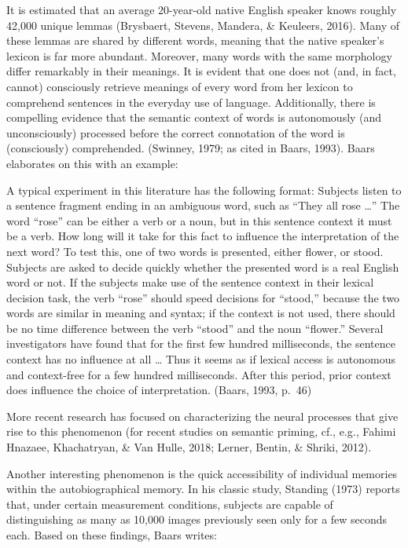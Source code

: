 \documentclass[12pt,twoside]{reedthesis}
\begin{document}
It is estimated that an average 20-year-old native English speaker knows roughly 42,000 unique lemmas (Brysbaert, Stevens, Mandera, \& Keuleers, 2016). Many of these lemmas are shared by different words, meaning that the native speaker's lexicon is far more abundant. Moreover, many words with the same morphology differ remarkably in their meanings. It is evident that one does not (and, in fact, cannot) consciously retrieve meanings of every word from her lexicon to comprehend sentences in the everyday use of language. Additionally, there is compelling evidence that the semantic context of words is autonomously (and unconsciously) processed before the correct connotation of the word is (consciously) comprehended. (Swinney, 1979; as cited in Baars, 1993). Baars elaborates on this with an example:

A typical experiment in this literature has the following format: Subjects listen to a sentence fragment ending in an ambiguous word, such as ``They all rose \ldots{}'' The word ``rose'' can be either a verb or a noun, but in this sentence context it must be a verb. How long will it take for this fact to influence the interpretation of the next word? To test this, one of two words is presented, either flower, or stood. Subjects are asked to decide quickly whether the presented word is a real English word or not. If the subjects make use of the sentence context in their lexical decision task, the verb ``rose'' should speed decisions for ``stood,'' because the two words are similar in meaning and syntax; if the context is not used, there should be no time difference between the verb ``stood'' and the noun ``flower.'' Several investigators have found that for the first few hundred milliseconds, the sentence context has no influence at all \ldots{} Thus it seems as if lexical access is autonomous and context-free for a few hundred milliseconds. After this period, prior context does influence the choice of interpretation. (Baars, 1993, p.~46)

More recent research has focused on characterizing the neural processes that give rise to this phenomenon (for recent studies on semantic priming, cf., e.g., Fahimi Hnazaee, Khachatryan, \& Van Hulle, 2018; Lerner, Bentin, \& Shriki, 2012).

Another interesting phenomenon is the quick accessibility of individual memories within the autobiographical memory. In his classic study, Standing (1973) reports that, under certain measurement conditions, subjects are capable of distinguishing as many as 10,000 images previously seen only for a few seconds each. Based on these findings, Baars writes:
\end{document}

